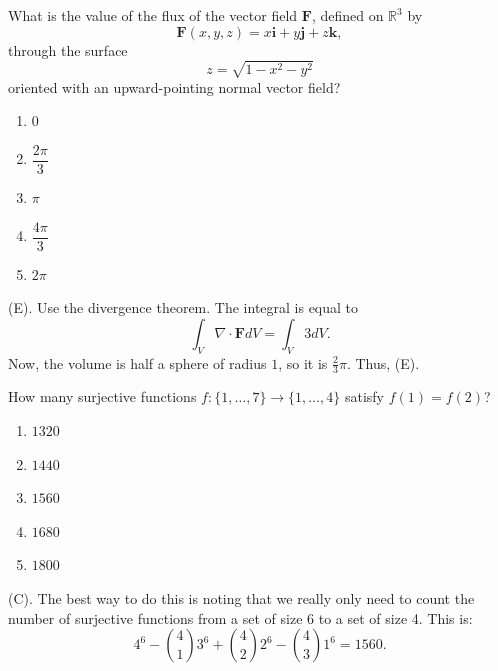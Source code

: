\begin{exercise}
What is the value of the flux of the vector field $\mathbf F$, defined on
$\mathbb{R}^3$ by
\[
\mathbf F(x,y,z)=x\mathbf i+y\mathbf j+z\mathbf k,
\]
through the surface
\[
z=\sqrt{1-x^2-y^2}
\]
oriented with an upward-pointing normal vector field?

\begin{enumerate}[label=(\Alph*)]
    \item $0$
    \item $\dfrac{2\pi}{3}$
    \item $\pi$
    \item $\dfrac{4\pi}{3}$
    \item $2\pi$
\end{enumerate}
\end{exercise}
\begin{solution}
(E). Use the divergence theorem. The integral is equal to 
\[
\int_V \nabla \cdot \mathbf{F} dV
= \int_V 3 dV.
\]
Now, the volume is half a sphere of radius $1$, so it is $\frac{2}{3} \pi$.
Thus, (E).
\end{solution}

\begin{exercise}
How many surjective functions $f:\{1,\dots,7\}\to\{1,\dots,4\}$ satisfy $f(1)=f(2)$?
\begin{enumerate}[label=(\Alph*)]
    \item $1320$
    \item $1440$
    \item $1560$
    \item $1680$
    \item $1800$
\end{enumerate}
\end{exercise}
\begin{solution}
(C). The best way to do this is noting that we really only 
need to count the number of surjective functions from a set 
of size 6 to a set of size 4. This is:
\[
4^6 - {4 \choose 1} 3^6 + {4 \choose 2} 2^6 - {4 \choose 3} 1^6
= 1560.
\]
\end{solution}

